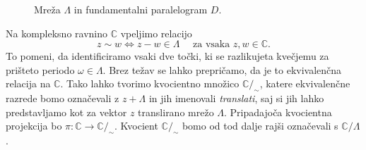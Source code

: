 \documentclass[mat1]{fmfdelo}
\numberwithin{equation}{section}
\newcommand{\C}{\mathbb C}
\theoremstyle{definition}
\begin{document}
\begin{figure}[H]
    \centering

    \caption{Mreža $\Lambda$ in fundamentalni paralelogram $D$.}
    \label{mreza}
\end{figure}

Na kompleksno ravnino $\C$ vpeljimo relacijo 
\[
    z \sim w \iff z - w \in \Lambda \quad \text{ za vsaka $z,w \in \C$.}
\]
To pomeni, da identificiramo vsaki dve točki, ki se razlikujeta kvečjemu za prišteto periodo $\omega \in \Lambda$. 
Brez težav se lahko prepričamo, da je to ekvivalenčna relacija na $\C$. Tako lahko tvorimo kvocientno množico $\C/_{\sim}$, katere ekvivalenčne razrede bomo označevali z $z + \Lambda$ in jih imenovali \emph{translati}, saj si jih lahko predstavljamo kot za vektor $z$ translirano mrežo $\Lambda$. Pripadajoča kvocientna projekcija bo $\pi : \C \to \C/_{\sim}$. Kvocient $\C/_{\sim}$ bomo od tod dalje rajši označevali s $\C/\Lambda$. 
\end{document}
